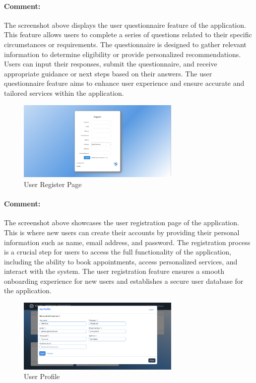 \begin{itemize}
\paragraph{Comment:} The screenshot above displays the user questionnaire feature of the application. This feature allows users to complete a series of questions related to their specific circumstances or requirements. The questionnaire is designed to gather relevant information to determine eligibility or provide personalized recommendations. Users can input their responses, submit the questionnaire, and receive appropriate guidance or next steps based on their answers. The user questionnaire feature aims to enhance user experience and ensure accurate and tailored services within the application.

\begin{figure}[htbp]
    \centering
    \includegraphics[width=0.7\textwidth]{SCREENSHOTS/user/register.png}
    \caption{User Register Page}
    \label{fig:user-register}
\end{figure}
\paragraph{Comment:} The screenshot above showcases the user registration page of the application. This is where new users can create their accounts by providing their personal information such as name, email address, and password. The registration process is a crucial step for users to access the full functionality of the application, including the ability to book appointments, access personalized services, and interact with the system. The user registration feature ensures a smooth onboarding experience for new users and establishes a secure user database for the application.

\begin{figure}[htbp]
    \centering
    \includegraphics[width=0.7\textwidth]{SCREENSHOTS/user/user_profile.PNG}
    \caption{User Profile}
    \label{fig:user-profile}
\end{figure}

\end{itemize}
